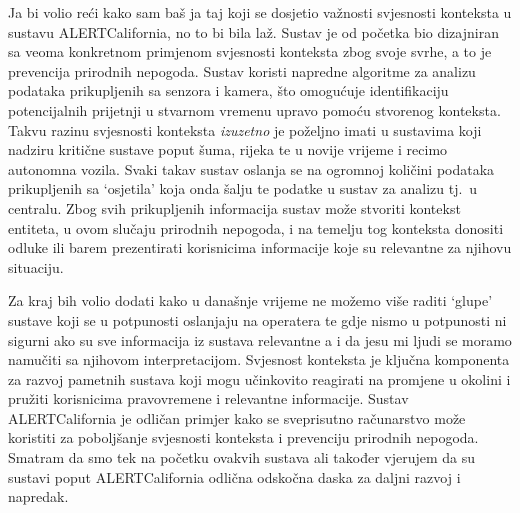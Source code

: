 \documentclass[12pt,a4paper]{article}
\begin{document}
\indent Ja bi volio reći kako sam baš ja taj koji se dosjetio važnosti svjesnosti konteksta u sustavu ALERTCalifornia, no to bi bila laž. Sustav je od početka bio dizajniran
sa veoma konkretnom primjenom svjesnosti konteksta zbog svoje svrhe, a to je prevencija prirodnih nepogoda. Sustav koristi napredne algoritme za analizu podataka
prikupljenih sa senzora i kamera, što omogućuje identifikaciju potencijalnih prijetnji u stvarnom vremenu upravo pomoću stvorenog konteksta.
Takvu razinu svjesnosti konteksta \textit{izuzetno} je poželjno imati u sustavima koji nadziru kritične sustave poput šuma, rijeka te u novije vrijeme i recimo autonomna vozila.
Svaki takav sustav oslanja se na ogromnoj količini podataka prikupljenih sa `osjetila' koja onda šalju te podatke u sustav za analizu tj.\ u centralu.
Zbog svih prikupljenih informacija sustav može stvoriti kontekst entiteta, u ovom slučaju prirodnih nepogoda, i na temelju tog konteksta donositi odluke ili barem
prezentirati korisnicima informacije koje su relevantne za njihovu situaciju.

\indent Za kraj bih volio dodati kako u današnje vrijeme ne možemo više raditi `glupe' sustave koji se u potpunosti oslanjaju na operatera te gdje nismo u potpunosti
ni sigurni ako su sve informacija iz sustava relevantne a i da jesu mi ljudi se moramo namučiti sa njihovom interpretacijom. Svjesnost konteksta je ključna komponenta
za razvoj pametnih sustava koji mogu učinkovito reagirati na promjene u okolini i pružiti korisnicima pravovremene i relevantne informacije. Sustav ALERTCalifornia je odličan
primjer kako se sveprisutno računarstvo može koristiti za poboljšanje svjesnosti konteksta i prevenciju prirodnih nepogoda.
Smatram da smo tek na početku ovakvih sustava ali također vjerujem da su sustavi poput ALERTCalifornia odlična odskočna daska za daljni razvoj i napredak.

\newpage


\end{document}
